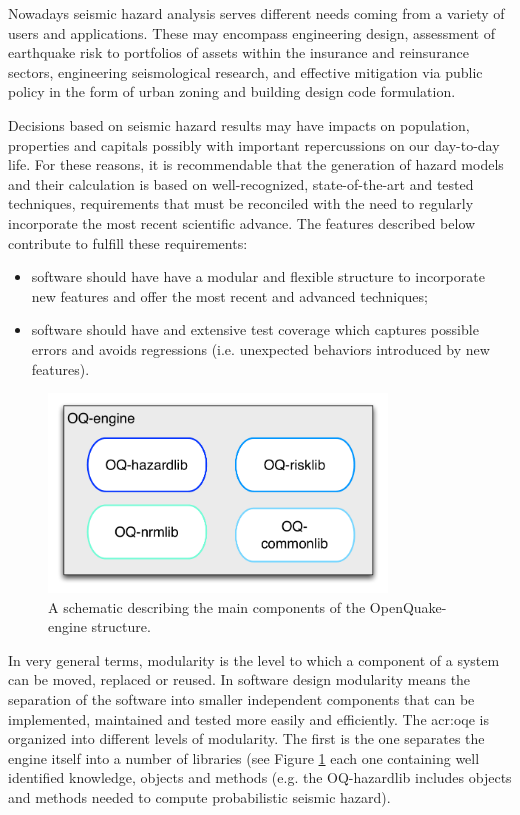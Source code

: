 Nowadays seismic hazard analysis serves different needs coming 
from a variety of users and applications. 
%
These may encompass engineering design, assessment of earthquake risk 
to portfolios of assets within the insurance and reinsurance sectors, 
engineering seismological research, and effective mitigation via public 
policy in the form of urban zoning and building design code formulation.

Decisions based on seismic hazard results may have impacts on
population, properties and capitals possibly with important repercussions 
on our day-to-day life. For these reasons, it is recommendable that 
the generation of hazard models and their calculation is based on 
well-recognized, state-of-the-art and tested techniques, requirements 
that must be reconciled with the need to regularly incorporate 
the most recent scientific advance. 
%
The features described below contribute to fulfill these requirements: 
%
\begin{itemize}
\item software should have have a modular and flexible structure to 
incorporate new features and offer the most recent and advanced 
techniques;
\item software should have and extensive test coverage which captures 
possible errors and avoids regressions (i.e. unexpected behaviors 
introduced by new features).
\end{itemize}
\begin{figure}[!ht]
\centering
\includegraphics[width=9cm]{./Pictures/qa/oq-engine_structure.pdf}
\caption{A schematic describing the main components of the OpenQuake-engine 
    structure.}
\label{fig:oqe_structure}
\end{figure}

In very general terms, modularity is the level to which a component 
of a system can be moved, replaced or reused. 
%
In software design modularity means the separation of the software
into smaller independent components that can be implemented, maintained 
and tested more easily and efficiently.
% 
The \gls{acr:oqe} is organized into different levels of modularity. The first
is the one separates the engine itself into a number of 
libraries (see Figure \ref{fig:oqe_structure} each one containing well 
identified knowledge, objects and methods (e.g. the OQ-hazardlib  
includes objects and methods needed to compute probabilistic 
seismic hazard). 

